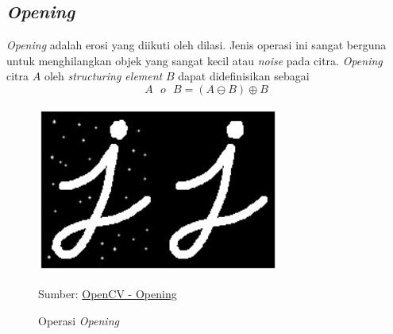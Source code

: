     \subsection{\textit{Opening}}
        \textit{Opening} adalah erosi yang diikuti oleh dilasi. Jenis operasi ini sangat berguna untuk menghilangkan objek yang sangat kecil atau \textit{noise} pada citra. \textit{Opening} citra $A$ oleh \textit{structuring element} $B$ dapat didefinisikan sebagai
        \begin{equation}\label{eq:2.15}
        A \text{ $o$ } B = (A \ominus B) \oplus B
        \end{equation}
        \begin{figure}[H]
        \centering
          \singlespacing
          \includegraphics[width=8cm]{image/opening.jpg}
          \caption{Operasi \textit{Opening}}
          \small{Sumber: \href{https://docs.opencv.org/3.4.15/d3/dbe/tutorial_opening_closing_hats.html}{OpenCV - Opening}}
          \label{fig:Opening}
        \end{figure}
    
